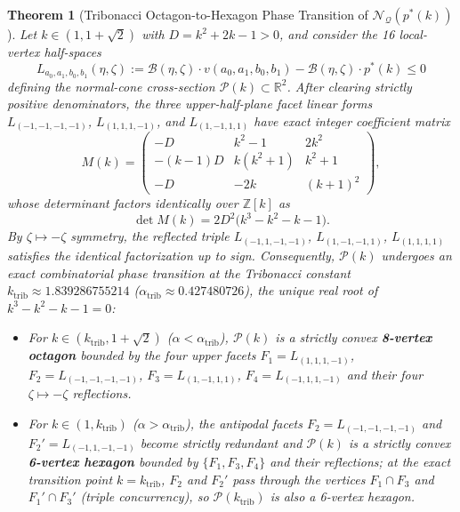 \documentclass[11pt,a4paper]{article}
\newtheorem{theorem}{Theorem}[section]
\newcommand{\RR}{\mathbb{R}}
\newcommand{\ZZ}{\mathbb{Z}}
\newcommand{\calN}{\mathcal{N}_{\mathcal{Q}}}
\newcommand{\calP}{\mathcal{P}}
\newcommand{\calB}{\mathcal{B}}
\begin{document}
\begin{theorem}[Tribonacci Octagon-to-Hexagon Phase Transition of $\calN(p^*(k))$]
\label{thm:tribonacci}
Let $k \in (1, 1+\sqrt{2})$ with $D = k^2 + 2k - 1 > 0$, and consider the 16 local-vertex half-spaces
\begin{equation}
  L_{a_0,a_1,b_0,b_1}(\eta,\zeta) := \calB(\eta,\zeta)\cdot v(a_0,a_1,b_0,b_1) - \calB(\eta,\zeta)\cdot p^*(k) \le 0
\end{equation}
defining the normal-cone cross-section $\calP(k) \subset \RR^2$.
After clearing strictly positive denominators, the three upper-half-plane facet linear forms $L_{(-1,-1,-1,-1)}$, $L_{(1,1,1,-1)}$, and $L_{(1,-1,1,1)}$ have exact integer coefficient matrix
\begin{equation}
  M(k) = \begin{pmatrix}
    -D & k^2 - 1 & 2k^2 \\
    -(k-1)D & k(k^2 + 1) & k^2 + 1 \\
    -D & -2k & (k+1)^2
  \end{pmatrix},
\end{equation}
whose determinant factors identically over $\ZZ[k]$ as
\begin{equation}
  \det M(k) = 2 D^2 \bigl(k^3 - k^2 - k - 1\bigr).
  \label{eq:tribonacci-det}
\end{equation}
By $\zeta \mapsto -\zeta$ symmetry, the reflected triple $L_{(-1,1,-1,-1)}$, $L_{(1,-1,-1,1)}$, $L_{(1,1,1,1)}$ satisfies the identical factorization up to sign. Consequently, $\calP(k)$ undergoes an exact combinatorial phase transition at the Tribonacci constant $k_{\mathrm{trib}} \approx 1.839286755214$ ($\alpha_{\mathrm{trib}} \approx 0.427480726$), the unique real root of $k^3 - k^2 - k - 1 = 0$:
\begin{itemize}[leftmargin=1.5em,itemsep=1pt]
  \item For $k \in (k_{\mathrm{trib}}, 1+\sqrt{2})$ ($\alpha < \alpha_{\mathrm{trib}}$), $\calP(k)$ is a strictly convex \textbf{8-vertex octagon} bounded by the four upper facets $F_1 = L_{(1,1,1,-1)}$, $F_2 = L_{(-1,-1,-1,-1)}$, $F_3 = L_{(1,-1,1,1)}$, $F_4 = L_{(-1,1,1,-1)}$ and their four $\zeta \mapsto -\zeta$ reflections.
  \item For $k \in (1, k_{\mathrm{trib}})$ ($\alpha > \alpha_{\mathrm{trib}}$), the antipodal facets $F_2 = L_{(-1,-1,-1,-1)}$ and $F_2' = L_{(-1,1,-1,-1)}$ become strictly redundant and $\calP(k)$ is a strictly convex \textbf{6-vertex hexagon} bounded by $\{F_1, F_3, F_4\}$ and their reflections; at the exact transition point $k = k_{\mathrm{trib}}$, $F_2$ and $F_2'$ pass through the vertices $F_1 \cap F_3$ and $F_1' \cap F_3'$ (triple concurrency), so $\calP(k_{\mathrm{trib}})$ is also a 6-vertex hexagon.
\end{itemize}
\end{theorem}
\end{document}
